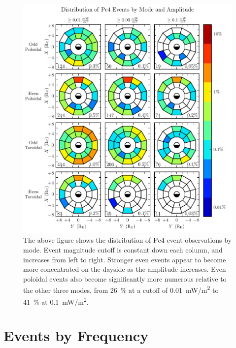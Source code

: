 \begin{figure}[!htb]
    \centering
    \includegraphics[width=\textwidth]{figures/mode_amp.pdf}
    \caption[Rate of Pc4 Events by Mode and Amplitude]{
      The above figure shows the distribution of Pc4 event observations by mode. Event magnitude cutoff is constant down each column, and increases from left to right. Stronger even events appear to become more concentrated on the dayside as the amplitude increases. Even poloidal events also become significantly more numerous relative to the other three modes, from \SI{26}{\percent} at a cutoff of \SI{0.01}{\mW/\m\squared} to \SI{41}{\percent} at \SI{0.1}{\mW/\m\squared}. 
    }
    \label{fig_mode_amp}
\end{figure}

\section{Events by Frequency}
  \label{sec_f}

